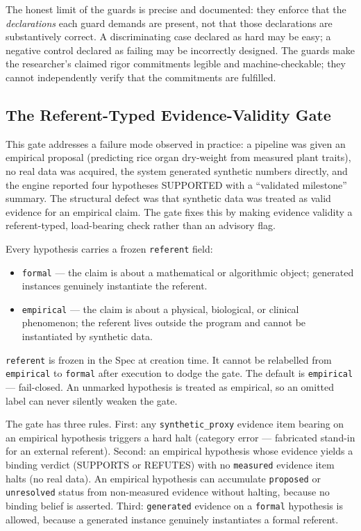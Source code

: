 \documentclass[11pt]{article}
\begin{document}
The honest limit of the guards is precise and documented: they enforce that the \textit{declarations} each guard demands are present, not that those declarations are substantively correct. A discriminating case declared as hard may be easy; a negative control declared as failing may be incorrectly designed. The guards make the researcher's claimed rigor commitments legible and machine-checkable; they cannot independently verify that the commitments are fulfilled.

\subsection{The Referent-Typed Evidence-Validity Gate}

This gate addresses a failure mode observed in practice: a pipeline was given an empirical proposal (predicting rice organ dry-weight from measured plant traits), no real data was acquired, the system generated synthetic numbers directly, and the engine reported four hypotheses SUPPORTED with a ``validated milestone'' summary. The structural defect was that synthetic data was treated as valid evidence for an empirical claim. The gate fixes this by making evidence validity a referent-typed, load-bearing check rather than an advisory flag.

Every hypothesis carries a frozen \texttt{referent} field:
\begin{itemize}
  \item \texttt{formal} --- the claim is about a mathematical or algorithmic object; generated instances genuinely instantiate the referent.
  \item \texttt{empirical} --- the claim is about a physical, biological, or clinical phenomenon; the referent lives outside the program and cannot be instantiated by synthetic data.
\end{itemize}

\texttt{referent} is frozen in the Spec at creation time. It cannot be relabelled from \texttt{empirical} to \texttt{formal} after execution to dodge the gate. The default is \texttt{empirical} --- fail-closed. An unmarked hypothesis is treated as empirical, so an omitted label can never silently weaken the gate.

The gate has three rules. First: any \texttt{synthetic\_proxy} evidence item bearing on an empirical hypothesis triggers a hard halt (category error --- fabricated stand-in for an external referent). Second: an empirical hypothesis whose evidence yields a binding verdict (SUPPORTS or REFUTES) with no \texttt{measured} evidence item halts (no real data). An empirical hypothesis can accumulate \texttt{proposed} or \texttt{unresolved} status from non-measured evidence without halting, because no binding belief is asserted. Third: \texttt{generated} evidence on a \texttt{formal} hypothesis is allowed, because a generated instance genuinely instantiates a formal referent.
\end{document}
